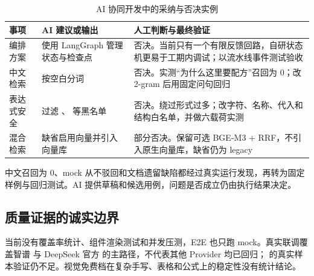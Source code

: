 \begin{table}[H]
\centering\footnotesize
\caption{AI 协同开发中的采纳与否决实例}
\begin{tabularx}{\textwidth}{@{}L{2.8cm}L{4.4cm}Y@{}}
\toprule
\textbf{事项} & \textbf{AI 建议或输出} & \textbf{人工判断与最终验证} \\
\midrule
编排方案 & 使用 LangGraph 管理状态与检查点 & 否决。当前只有一个有限反馈回路，自研状态机更易于工期内调试；以流水线事件测试验收 \\
中文检索 & 按空白分词 & 否决。实测“为什么这里要配方”召回为 0；改 2-gram 后用固定问句回归 \\
表达式安全 & 过滤 、 等黑名单 & 否决。绕过形式过多；改字符、名称、代入和结构白名单，并做六载荷实测 \\
 混合检索 & 缺省启用向量并引入向量库 & 部分否决。保留可选 BGE-M3 + RRF，不引入原生向量库，缺省仍为 legacy \\
 \bottomrule
\end{tabularx}
\end{table}

中文召回为 0、mock 从不驳回和文档遗留缺陷都经过真实运行发现，再转为固定样例与回归测试。AI 提供草稿和候选用例，问题是否成立仍由执行结果决定。

\subsection{质量证据的诚实边界}

当前没有覆盖率统计、组件渲染测试和并发压测，E2E 也只跑 mock。真实联调覆盖智谱  与 DeepSeek 官方  的主路径，不代表其他 Provider 均已回归； 的真实样本验证仍不足。视觉免费档在复杂手写、表格和公式上的稳定性没有统计结论。
